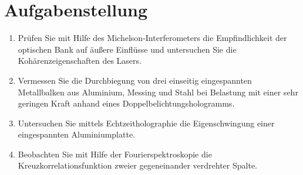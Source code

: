 \section{Aufgabenstellung}

\begin{enumerate}
\item Prüfen Sie mit Hilfe des Michelson-Interferometers die Empfindlichkeit der optischen Bank auf  äußere Einflüsse und untersuchen Sie die Kohärenzeigenschaften des Lasers.
\item Vermessen Sie die Durchbiegung von drei einseitig eingespannten Metallbalken aus Aluminium, Messing und Stahl bei Belastung mit einer sehr geringen Kraft anhand eines Doppelbelichtungshologramms.
\item Untersuchen Sie mittels Echtzeitholographie die Eigenschwingung einer eingespannten Aluminiumplatte.
\item Beobachten Sie mit Hilfe der Fourierspektroskopie die Kreuzkorrelationsfunktion zweier gegeneinander verdrehter Spalte.
\end{enumerate}